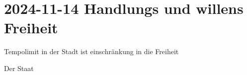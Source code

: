 \section{2024-11-14 Handlungs und willens Freiheit}

Tempolimit in der Stadt ist einschränkung in die Freiheit

\startitemize[packed]
\item Der Staat
\item 
\stopitemize
